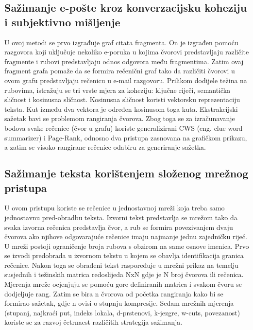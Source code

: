 \documentclass[times, utf8, zavrsni, numeric]{fer}
\begin{document}
\subsection{Sažimanje e-pošte kroz konverzacijsku koheziju i subjektivno mišljenje}
U ovoj metodi se prvo izgrađuje graf citata fragmenta. On je izgrađen pomoću razgovora koji uključuje nekoliko e-poruka u kojima čvorovi predstavljaju različite fragmente i rubovi predstavljaju odnos odgovora među fragmentima.
Zatim ovaj fragment grafa pomaže da se formira rečenični graf tako da različiti čvorovi u ovom grafu predstavljaju rečenicu u e-mail razgovoru.
Prilikom dodijele težina na rubovima, istražuju se tri vrste mjera za koheziju: ključne riječi, semantička sličnost i kosinusna sličnost.
Kosinusna sličnost koristi vektorsku reprezentaciju teksta. Kut između dva vektora je određen kosinusom toga kuta.
Ekstrakcijski sažetak bavi se problemom rangiranja čvorova. Zbog toga se za izračunavanje bodova svake rečenice (čvor u grafu) koriste generalizirani CWS (eng. clue word summarizer) i Page-Rank, odnosno dva pristupa zasnovana na grafičkom prikazu, a zatim se visoko rangirane rečenice odabiru za generiranje sažetka.

\subsection{Sažimanje teksta korištenjem složenog mrežnog pristupa}
U ovom pristupu koriste se rečenice u jednostavnoj mreži koja treba samo jednostavnu pred-obradbu teksta.
Izvorni tekst predstavlja se mrežom tako da svaka izvorna rečenica predstavlja čvor, a rub se formira povezivanjem dvaju čvorova ako njihove odgovarajuće rečenice imaju najmanje jednu zajedničku riječ.
U mreži postoji ograničenje broja rubova s obzirom na same osnove imenica.
Prvo se izvodi predobrada u izvornom tekstu u kojem se obavlja identifikacija granica rečenice.
Nakon toga se obrađeni tekst raspoređuje u mrežni prikaz na temelju susjednih i težinskih matrica redoslijeda NxN gdje je N broj čvorova ili rečenica.
Mjerenja mreže ocjenjuju se pomoću gore definiranih matrica i svakom čvoru se dodjeljuje rang.
Zatim se bira n čvorova od početka rangiranja kako bi se formirao sažetak, gdje n ovisi o stupnju kompresije.
Sedam mrežnih mjerenja (stupanj, najkraći put, indeks lokala, d-prstenovi, k-jezgre, w-cuts, povezanost) koriste se za razvoj četrnaest različitih strategija sažimanja.
\end{document}
